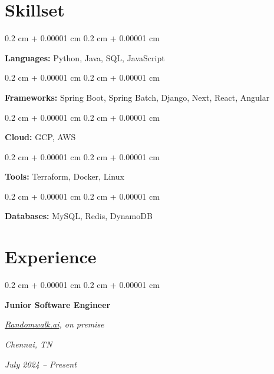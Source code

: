 \documentclass[10pt, letterpaper]{article}
\newenvironment{onecolentry}{
    \begin{adjustwidth}{
        0.2 cm + 0.00001 cm
    }{
        0.2 cm + 0.00001 cm
    }
}{
    \end{adjustwidth}
} %
\newenvironment{twocolentry}[2][]{
    \onecolentry
    \def\secondColumn{#2}
    \setcolumnwidth{\fill, 4.5 cm}
    \begin{paracol}{2}
}{
    \switchcolumn \raggedleft \secondColumn
    \end{paracol}
    \endonecolentry
} %
\let\hrefWithoutArrow\href
\renewcommand{\href}[2]{\hrefWithoutArrow{#1}{\ifthenelse{\equal{#2}{}}{ }{#2 }\raisebox{.15ex}{\footnotesize \faExternalLink*}}}
\begin{document}
\section{Skillset}

\begin{onecolentry}
    \textbf{Languages:} Python, Java, SQL, JavaScript
\end{onecolentry}
\vspace{0.10 cm}

\begin{onecolentry}
    \textbf{Frameworks:} Spring Boot, Spring Batch, Django, Next, React, Angular
\end{onecolentry}
\vspace{0.10 cm}

\begin{onecolentry}
    \textbf{Cloud:} GCP, AWS
\end{onecolentry}
\vspace{0.10 cm}

\begin{onecolentry}
    \textbf{Tools:} Terraform, Docker, Linux
\end{onecolentry}
\vspace{0.10 cm}

\begin{onecolentry}
    \textbf{Databases:} MySQL, Redis, DynamoDB
\end{onecolentry}
\vspace{0.10 cm}

\section{Experience}

\begin{twocolentry}{
        \textit{Chennai, TN}

        \textit{July 2024 – Present}}
    \textbf{Junior Software Engineer}

    \textit{{\hrefWithoutArrow{https://randomwalk.ai/}{\color{black}\hspace*{0.13cm}Randomwalk.ai}}, on premise}
\end{twocolentry}
\end{document}
